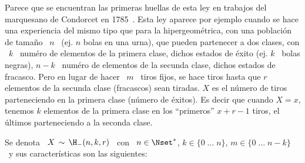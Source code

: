 \label{Sssec:MP:HipergeometricaNegativa}

Parece  que se  encuentran las  primeras  huellas de  esta ley  en trabajos  del
marquesano  de Condorcet  en 1785~\cite{Con85}.   Esta ley  aparece  por ejemplo
cuando se hace  una experiencia del mismo tipo que  para la hipergeom\'etrica, con
una poblaci\'on  de tama\~no \ $n$  \ (ej.  $n$  bolas en una urna),  que pueden
partenecer a dos clases, con \ $k$  \ num\'ero de elementos de la primera clase,
dichos  estados de  \'exito  (ej.  $k$  \  bolas negras),  $n-k$  \ num\'ero  de
elementos de  la secunda clase,  dichos estados de  fracasco.  Pero en  lugar de
hacer \ $m$ \  tiros fijos, se hace tiros hasta que  $r$ elementos de la secunda
clase (fracascos) sean tiradas.  $X$ es el n\'umero de tiros parteneciendo en la
primera clase (n\'umero  de \'exitos). Es decir que cuando $X  = x$, tenemos $k$
elementos de  la primera clase en  los ``primeros'' $x+r-1$  tiros, el \'ultimos
parteneciendo a la seconda clase.

Se denota \ $X \,  \sim \, \H_-(n,k,r)$ \ con \ $n \in \Nset^*$,  \quad $k \in \{ 0 \;
\ldots \; n \}$, \quad $m \in \{  0 \; \ldots \; n-k \}$ \ y sus caracter\'isticas
son las siguientes:

